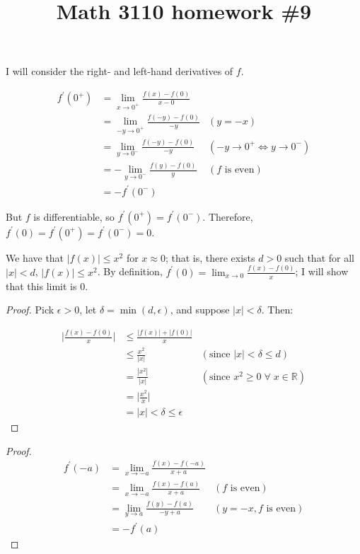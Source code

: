 

\title{Math 3110 homework \#9}
\author{\name}
\maketitle

I will consider the right- and left-hand derivatives of $f$.

\begin{align*}
  f^{\prime}(0^+) &= \lim_{x \rightarrow 0^+} \frac{f(x) - f(0)}{x - 0} \\
  &= \lim_{-y \rightarrow 0^+} \frac{f(-y) - f(0)}{-y} & (y = -x) \\
  &= \lim_{y \rightarrow 0^-} \frac{f(-y) - f(0)}{-y} & (-y \rightarrow 0^+ \iff y \rightarrow 0^-) \\
  &= -\lim_{y \rightarrow 0^-} \frac{f(y) - f(0)}{y} & (f\textrm{ is even}) \\
  &= -f^{\prime}(0^-)
\end{align*}

But $f$ is differentiable, so $f^{\prime}(0^+) = f^{\prime}(0^-)$. Therefore, $f^{\prime}(0) = f^{\prime}(0^+) = f^{\prime}(0^-) = 0$.


We have that $|f(x)| \leq x^2$ for $x \approx 0$; that is, there exists $d > 0$ such that for all $|x| < d$, $|f(x)| \leq x^2$. By definition, $f^{\prime}(0) = \lim_{x \rightarrow 0} \frac{f(x) - f(0)}{x}$; I will show that this limit is 0.

\begin{proof}
  Pick $\epsilon > 0$, let $\delta = \min(d, \epsilon)$, and suppose $|x| < \delta$. Then:

  \begin{align*}
    \Big|\frac{f(x) - f(0)}{x}\Big| &\leq \frac{|f(x)| + |f(0)|}{x} \\
    &\leq \frac{x^2}{|x|} & (\textrm{since } |x| < \delta \leq d) \\
    &= \frac{|x^2|}{|x|} & (\textrm{since } x^2 \geq 0 \;\forall\; x \in \mathbb{R}) \\
    &= \Big|\frac{x^2}{x}\Big| \\
    &= |x| < \delta \leq \epsilon
  \end{align*}
\end{proof}


\begin{proof}
  \begin{align*}
    f^{\prime}(-a) &= \lim_{x \rightarrow -a} \frac{f(x) - f(-a)}{x + a} \\
    &= \lim_{x \rightarrow -a} \frac{f(x) - f(a)}{x + a} & (f\textrm{ is even}) \\
    &= \lim_{y \rightarrow a} \frac{f(y) - f(a)}{-y + a} & (y = -x, f\textrm{ is even}) \\
    &= -f^{\prime}(a)
  \end{align*}
\end{proof}

